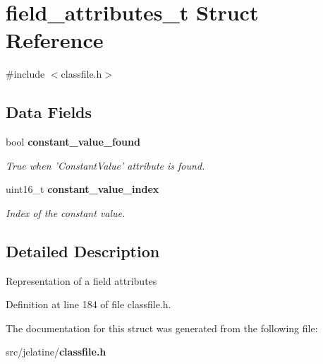 \section{field\_\-attributes\_\-t Struct Reference}
\label{structfield__attributes__t}


{\ttfamily \#include $<$classfile.h$>$}

\subsection*{Data Fields}
\begin{DoxyCompactItemize}
\item 
bool {\bf constant\_\-value\_\-found}\label{structfield__attributes__t_ae0597149adf8f57c15b8c5b46cf9a7f6}

\begin{DoxyCompactList}\small\item\em True when 'ConstantValue' attribute is found. \item\end{DoxyCompactList}\item 
uint16\_\-t {\bf constant\_\-value\_\-index}\label{structfield__attributes__t_a8dc5204ab2172a5e7522a8eae18aa048}

\begin{DoxyCompactList}\small\item\em Index of the constant value. \item\end{DoxyCompactList}\end{DoxyCompactItemize}


\subsection{Detailed Description}
Representation of a field attributes 

Definition at line 184 of file classfile.h.



The documentation for this struct was generated from the following file:\begin{DoxyCompactItemize}
\item 
src/jelatine/{\bf classfile.h}\end{DoxyCompactItemize}
